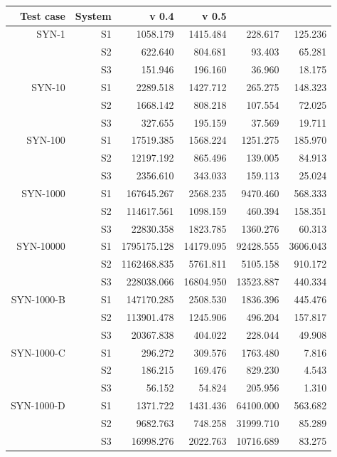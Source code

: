 \renewcommand{\arraystretch}{1.5}
\begin{table}[h]
  \centering
  \begin{tabular}{r|r|r|r|r|r}
	Test case & System & \snowman{} v 0.4 & \snowman{} v 0.5 & \snortmanager{} &
	\bhtb{} \\
\hline
SYN-1 & S1 & 1058.179 & 1415.484 & 228.617 & 125.236 \\
 & S2 & 622.640 & 804.681 & 93.403 & 65.281 \\
 & S3 & 151.946 & 196.160 & 36.960 & 18.175 \\
\hline
SYN-10 & S1 & 2289.518 & 1427.712 & 265.275 & 148.323 \\
 & S2 & 1668.142 & 808.218 & 107.554 & 72.025 \\
 & S3 & 327.655 & 195.159 & 37.569 & 19.711 \\
\hline
SYN-100 & S1 & 17519.385 & 1568.224 & 1251.275 & 185.970 \\
 & S2 & 12197.192 & 865.496 & 139.005 & 84.913 \\
 & S3 & 2356.610 & 343.033 & 159.113 & 25.024 \\
\hline
SYN-1000 & S1 & 167645.267 & 2568.235 & 9470.460 & 568.333 \\
 & S2 & 114617.561 & 1098.159 & 460.394 & 158.351 \\
 & S3 & 22830.358 & 1823.785 & 1360.276 & 60.313 \\
\hline
SYN-10000 & S1 & 1795175.128 & 14179.095 & 92428.555 & 3606.043 \\
 & S2 & 1162468.835 & 5761.811 & 5105.158 & 910.172 \\
 & S3 & 228038.066 & 16804.950 & 13523.887 & 440.334 \\
\hline
SYN-1000-B & S1 & 147170.285 & 2508.530 & 1836.396 & 445.476 \\
 & S2 & 113901.478 & 1245.906 & 496.204 & 157.817 \\
 & S3 & 20367.838 & 404.022 & 228.044 & 49.908 \\
\hline
SYN-1000-C & S1 & 296.272 & 309.576 & 1763.480 & 7.816 \\
 & S2 & 186.215 & 169.476 & 829.230 & 4.543 \\
 & S3 & 56.152 & 54.824 & 205.956 & 1.310 \\
\hline
SYN-1000-D & S1 & 1371.722 & 1431.436 & 64100.000 & 563.682 \\
 & S2 & 9682.763 & 748.258 & 31999.710 & 85.289 \\
 & S3 & 16998.276 & 2022.763 & 10716.689 & 83.275 \\

\end{tabular}
\end{table}
